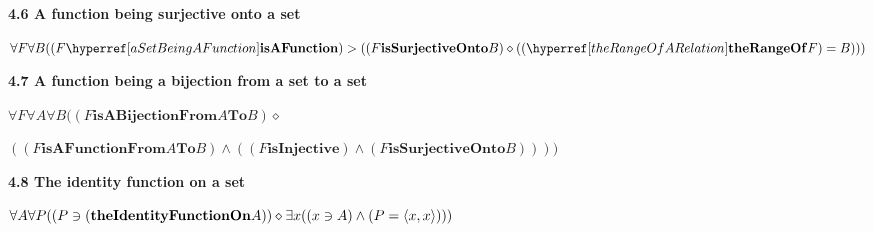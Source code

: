 \documentclass{article}
\begin{document}
\par\bigskip{}\label{aFunctionBeingSurjectiveOntoASet}
\noindent\textbf{4.6 A function being surjective onto a set}\par\smallskip
\noindent\(\displaystyle \forall F\forall B(\Fun{F}>((F\mathbf{isSurjectiveOnto} B)\diamond(\ran{F}=B)))\)\par

\par\bigskip{}\label{aFunctionBeingABijectionFromASetToASet}
\noindent\textbf{4.7 A function being a bijection from a set to a set}\par\smallskip
\noindent\(\displaystyle \forall F\forall A\forall B((F\mathbf{isABijectionFrom} A\mathbf{To} B)\diamond\)\par
\noindent\(\displaystyle ((F\hyperref[aFunctionBeingFromASetToASet]{\mathbf{isAFunctionFrom}} A\mathbf{To} B)\land((F\hyperref[aFunctionBeingInjective]{\mathbf{isInjective}} )\land(F\hyperref[aFunctionBeingSurjectiveOntoASet]{\mathbf{isSurjectiveOnto}} B))))\)\par

\par\bigskip{}\label{theIdentityFunctionOnASet}
\noindent\textbf{4.8 The identity function on a set}\par\smallskip
\begingroup\small
\begin{fitchproof}

\end{fitchproof}
\endgroup

\noindent\(\displaystyle \forall A\forall P((P\owns(\mathbf{theIdentityFunctionOn} A))\diamond\exists x((x\owns A)\land(P=\langle x,x\rangle)))\)\par
\end{document}
